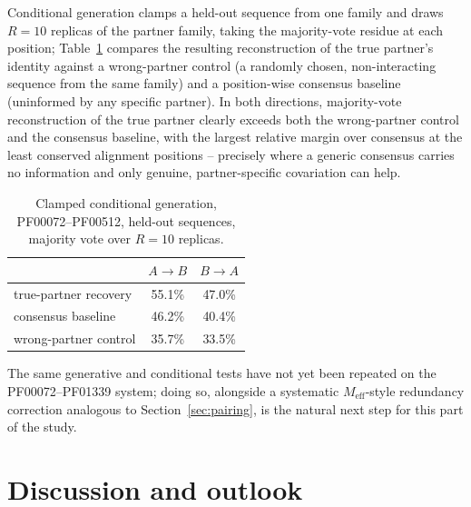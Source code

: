 \documentclass[11pt]{article}
\begin{document}
Conditional generation clamps a held-out sequence from one family and
draws $R=10$ replicas of the partner family, taking the majority-vote
residue at each position; Table~\ref{tab:conditional} compares the
resulting reconstruction of the true partner's identity against a
wrong-partner control (a randomly chosen, non-interacting sequence from
the same family) and a position-wise consensus baseline (uninformed by any
specific partner). In both directions, majority-vote reconstruction of the
true partner clearly exceeds both the wrong-partner control and the
consensus baseline, with the largest relative margin over consensus at the
least conserved alignment positions -- precisely where a generic consensus
carries no information and only genuine, partner-specific covariation can
help.

\begin{table}[htb]
\centering
\caption{Clamped conditional generation, PF00072--PF00512, held-out
sequences, majority vote over $R=10$ replicas.}
\label{tab:conditional}
\begin{tabular}{lcc}
\toprule
 & $A\to B$ & $B\to A$ \\
\midrule
true-partner recovery & 55.1\% & 47.0\% \\
consensus baseline & 46.2\% & 40.4\% \\
wrong-partner control & 35.7\% & 33.5\% \\
\bottomrule
\end{tabular}
\end{table}

The same generative and conditional tests have not yet been repeated on
the PF00072--PF01339 system; doing so, alongside a systematic
$M_{\mathrm{eff}}$-style redundancy correction analogous to
Section~\ref{sec:pairing}, is the natural next step for this part of the
study.

\section{Discussion and outlook}
\label{sec:discussion}
\end{document}

